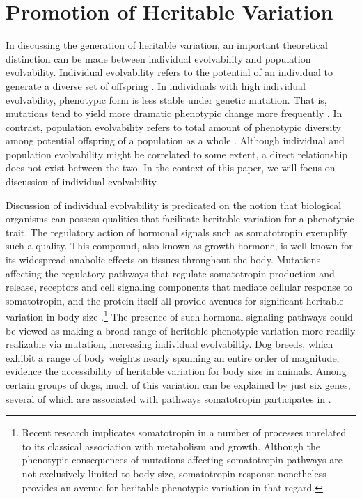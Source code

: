 \section{Promotion of Heritable Variation} \label{sec:heritable_variation}

In discussing the generation of heritable variation, an important theoretical distinction can be made between individual evolvability and population evolvability. Individual evolvability refers to the potential of an individual to generate a diverse set of offspring \cite{Mengistu2016EvolvabilityIt}. In individuals with high individual evolvability, phenotypic form is less stable under genetic mutation. That is, mutations tend to yield more dramatic phenotypic change more frequently \cite{Wilder2015ReconcilingEvolvability}. In contrast, population evolvability refers to total amount of phenotypic diversity among potential offspring of a population as a whole \cite{Wilder2015ReconcilingEvolvability}. Although individual and population evolvability might be correlated to some extent, a direct relationship does not exist between the two. In the context of this paper, we will focus on discussion of individual evolvability.

Discussion of individual evolvability is predicated on the notion that biological organisms can possess qualities that facilitate heritable variation for a phenotypic trait. The regulatory action of hormonal signals such as somatotropin exemplify such a quality. This compound, also known as growth hormone, is well known for its widespread anabolic effects on tissues throughout the body. Mutations affecting the regulatory pathways that regulate somatotropin production and release, receptors and cell signaling components that mediate cellular response to somatotropin, and the protein itself all provide avenues for significant heritable variation in body size \cite{Devesa2016MultipleGrowth}.\footnote{Recent research implicates somatotropin in a number of processes unrelated to its classical association with metabolism and growth. Although the phenotypic consequences of mutations affecting somatotropin pathways are not exclusively limited to body size, somatotropin response nonetheless provides an avenue for heritable phenotypic variation in that regard.} The presence of such hormonal signaling pathways could be viewed as making a broad range of heritable phenotypic variation more readily realizable via mutation, increasing individual evolvabiltiy. Dog breeds, which exhibit a range of body weights nearly spanning an entire order of magnitude, evidence the accessibility of heritable variation for body size in animals. Among certain groups of dogs, much of this variation can be explained by just six genes, several of which are associated with pathways somatotropin participates in \cite{Rimbault2013DerivedBreeds.}.

